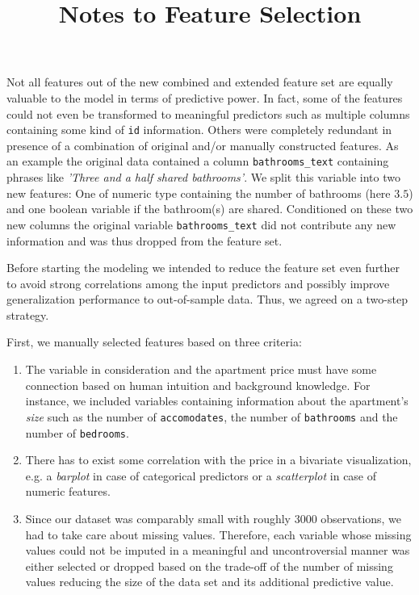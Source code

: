\documentclass[12pt, letterpaper]{article}
\title{Notes to Feature Selection}
\author{}
\date{}
\begin{document}
\maketitle
\tableofcontents
\setcounter{tocdepth}{3}

Not all features out of the new combined and extended feature set are equally valuable to the model in terms of predictive power.
In fact, some of the features could not even be transformed to meaningful predictors such as multiple columns containing some kind of \texttt{id} information.
Others were completely redundant in presence of a combination of original and/or manually constructed features.
As an example the original data contained a column \verb|bathrooms_text| containing phrases like \emph{'Three and a half shared bathrooms'}.
We split this variable into two new features: One of numeric type containing the number of bathrooms (here $3.5$) and one boolean variable if the bathroom(s) are shared.
Conditioned on these two new columns the original variable \verb|bathrooms_text| did not contribute any new information and was thus dropped from the feature set.

Before starting the modeling we intended to reduce the feature set even further to avoid strong correlations among the input predictors and possibly improve generalization performance to out-of-sample data.
Thus, we agreed on a two-step strategy.

First, we manually selected features based on three criteria:
\begin{enumerate}
    \item The variable in consideration and the apartment price must have some connection based on human intuition and background knowledge.
          For instance, we included variables containing information about the apartment's \emph{size} such as the number of \texttt{accomodates}, the number of \texttt{bathrooms} and the number of \texttt{bedrooms}.
    \item There has to exist some correlation with the price in a bivariate visualization, e.g. a \emph{barplot} in case of categorical predictors or a \emph{scatterplot} in case of numeric features.
    \item Since our dataset was comparably small with roughly $3000$ observations, we had to take care about missing values.
          Therefore, each variable whose missing values could not be imputed in a meaningful and uncontroversial manner was either selected or dropped based on the trade-off of the number of missing values reducing the size of the data set and its additional predictive value.
\end{enumerate}
\end{document}
